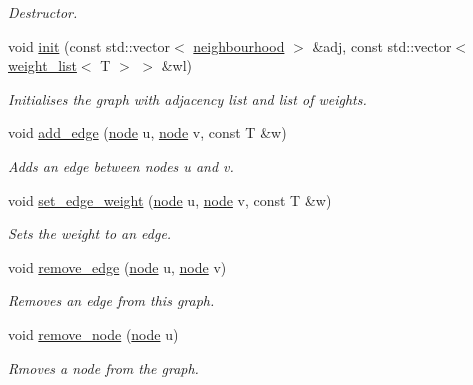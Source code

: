 \begin{DoxyCompactItemize}
\begin{DoxyCompactList}\small\item\em Destructor. \end{DoxyCompactList}\item 
void \hyperlink{classlgraph_1_1wugraph_adc6e1a1983a2b564349a505e2c8f80c4}{init} (const std\-::vector$<$ \hyperlink{namespacelgraph_a052e7766c13f3a43cec0aec8173fdede}{neighbourhood} $>$ \&adj, const std\-::vector$<$ \hyperlink{namespacelgraph_a1e0fd5ef0a78b2a92da48adbed265cb6}{weight\-\_\-list}$<$ T $>$ $>$ \&wl)
\begin{DoxyCompactList}\small\item\em Initialises the graph with adjacency list and list of weights. \end{DoxyCompactList}\item 
void \hyperlink{classlgraph_1_1wugraph_a8bf315b2e763cbef5d7c6bcb7cc657f6}{add\-\_\-edge} (\hyperlink{namespacelgraph_a397169dd66adf725210a30fb7251773e}{node} u, \hyperlink{namespacelgraph_a397169dd66adf725210a30fb7251773e}{node} v, const T \&w)
\begin{DoxyCompactList}\small\item\em Adds an edge between nodes {\itshape u} and {\itshape v}. \end{DoxyCompactList}\item 
void \hyperlink{classlgraph_1_1wugraph_a6400d861723b555de718c6e7816b8a43}{set\-\_\-edge\-\_\-weight} (\hyperlink{namespacelgraph_a397169dd66adf725210a30fb7251773e}{node} u, \hyperlink{namespacelgraph_a397169dd66adf725210a30fb7251773e}{node} v, const T \&w)
\begin{DoxyCompactList}\small\item\em Sets the weight to an edge. \end{DoxyCompactList}\item 
void \hyperlink{classlgraph_1_1wugraph_a3debc0be0d08b7cfcbe942aadbe81e1f}{remove\-\_\-edge} (\hyperlink{namespacelgraph_a397169dd66adf725210a30fb7251773e}{node} u, \hyperlink{namespacelgraph_a397169dd66adf725210a30fb7251773e}{node} v)
\begin{DoxyCompactList}\small\item\em Removes an edge from this graph. \end{DoxyCompactList}\item 
void \hyperlink{classlgraph_1_1wugraph_ad8eff47efc751e7bc5aa10b79ff70633}{remove\-\_\-node} (\hyperlink{namespacelgraph_a397169dd66adf725210a30fb7251773e}{node} u)
\begin{DoxyCompactList}\small\item\em Rmoves a node from the graph. \end{DoxyCompactList}\item 

\end{DoxyCompactItemize}
